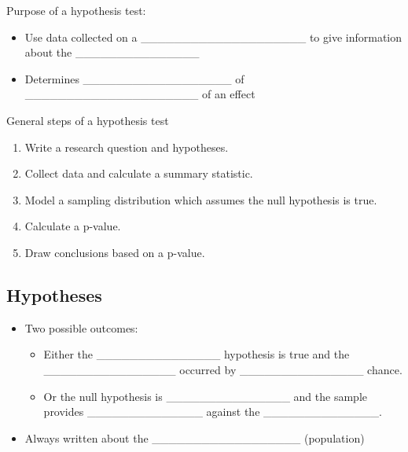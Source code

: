 \documentclass[
]{report}
\begin{document}
Purpose of a hypothesis test:

\begin{itemize}
\item
  Use data collected on a \_\_\_\_\_\_\_\_\_\_\_\_\_\_\_\_\_\_\_\_ to give information about the \_\_\_\_\_\_\_\_\_\_\_\_\_\_\_
\item
  Determines \_\_\_\_\_\_\_\_\_\_\_\_\_\_\_\_\_\_ of \_\_\_\_\_\_\_\_\_\_\_\_\_\_\_\_\_\_\_\_\_ of an effect
\end{itemize}

General steps of a hypothesis test

\begin{enumerate}
\def\labelenumi{\arabic{enumi}.}
\item
  Write a research question and hypotheses.
\item
  Collect data and calculate a summary statistic.
\item
  Model a sampling distribution which assumes the null hypothesis is true.
\item
  Calculate a p-value.
\item
  Draw conclusions based on a p-value.
\end{enumerate}

\hypertarget{hypotheses}{%
\subsection*{Hypotheses}\label{hypotheses}}


\begin{itemize}
\item
  Two possible outcomes:

  \begin{itemize}
  \item
    Either the \_\_\_\_\_\_\_\_\_\_\_\_\_\_\_ hypothesis is true and the \_\_\_\_\_\_\_\_\_\_\_\_\_\_\_\_ occurred by \_\_\_\_\_\_\_\_\_\_\_\_\_\_\_ chance.
  \item
    Or the null hypothesis is \_\_\_\_\_\_\_\_\_\_\_\_\_\_\_ and the sample provides \_\_\_\_\_\_\_\_\_\_\_\_\_\_ against the \_\_\_\_\_\_\_\_\_\_\_\_\_\_.
  \end{itemize}
\item
  Always written about the \_\_\_\_\_\_\_\_\_\_\_\_\_\_\_\_\_\_ (population)
\end{itemize}

\end{document}
